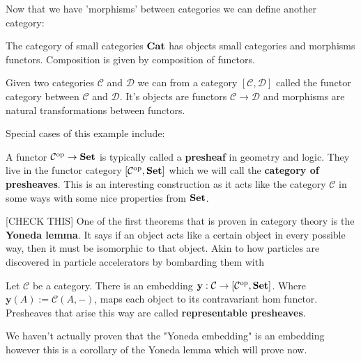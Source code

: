 Now that we have 'morphisms' between categories we can define another category:

\begin{example}
	The category of small categories ${\normalfont\textbf{Cat}}$ has objects small categories and morphisms functors. Composition is given by composition of functors.
\end{example}

\begin{defin}
\end{defin}

\begin{example}
    Given two categories $\mathcal{C}$ and $\mathcal{D}$ we can from a category $[\mathcal{C}, \mathcal{D}]$ called the functor category between $\mathcal{C}$ and $\mathcal{D}$. It's objects are functors $\mathcal{C} \to \mathcal{D}$ and morphisms are natural transformations between functors.
\end{example}

Special cases of this example include:

\begin{example}
    A functor $\mathcal{C}^{\text{op}} \to {\normalfont\textbf{Set}}$ is typically called a \textbf{presheaf} in geometry and logic. They live in the functor category $[\mathcal{C}^{\text{op}}, {\normalfont\textbf{Set}}]$ which we will call the \textbf{category of presheaves}. This is an interesting construction as it acts like the category $\mathcal{C}$ in some ways with some nice properties from ${\normalfont\textbf{Set}}$.
\end{example}


[CHECK THIS] One of the first theorems that is proven in category theory is the \textbf{Yoneda lemma}. It says if an object acts like a certain object in every possible way, then it must be isomorphic to that object. Akin to how particles are discovered in particle accelerators by bombarding them with 

\begin{lemma}
    Let $\mathcal{C}$ be a category. There is an embedding $\mathbf{y} : \mathcal{C} \to [\mathcal{C}^{\text{op}}, {\normalfont\textbf{Set}}]$. 
    Where $\mathbf{y}(A) := \mathcal{C}( A, - )$, maps each object to its contravariant hom functor. 
    Presheaves that arise this way are called \textbf{representable presheaves}.
\end{lemma}

\begin{remark}
    We haven't actually proven that the "Yoneda embedding" is an embedding however this is a corollary of the Yoneda lemma which will prove now.
\end{remark}

